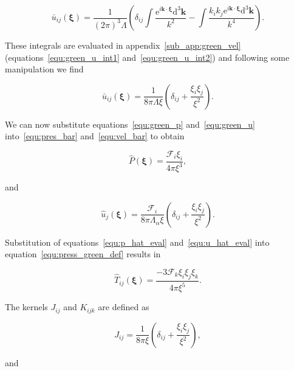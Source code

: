\documentclass[12pt]{article}
\begin{document}
\begin{equation}
\label{equ:green_u_int}
\bar{u}_{ij} (\boldsymbol\xi) = \frac{1}{(2 \pi)^{3} \Lambda} \left(\delta_{ij} \int \frac{\mathrm{e}^{i \boldsymbol{k} \cdot \boldsymbol\xi} \mathrm{d}^{3} \boldsymbol{k}}{k^{2}} - \int \frac{k_{i} k_{j} \mathrm{e}^{i \boldsymbol{k} \cdot \boldsymbol\xi} \mathrm{d}^{3} \boldsymbol{k}}{k^{4}} \right).
\end{equation}

These integrals are evaluated in appendix~\ref{sub_app:green_vel} (equations~\ref{equ:green_u_int1} and~\ref{equ:green_u_int2}) and following some manipulation we find

\begin{equation}
\label{equ:green_u}
\bar{u}_{ij} (\boldsymbol\xi) = \frac{1}{8 \pi \Lambda \xi} \left(\delta_{ij} + \frac{\xi_{i} \xi_{j}}{\xi^{2}} \right).
\end{equation}

We can now substitute equations~\ref{equ:green_p} and~\ref{equ:green_u} into~\ref{equ:pres_bar} and~\ref{equ:vel_bar} to obtain

\begin{equation}
\label{equ:p_hat_eval}
\hat{P} (\boldsymbol\xi) = \frac{\mathcal{F}_{i} \xi_{i}}{4 \pi \xi^{3}},
\end{equation}

and 

\begin{equation}
\label{equ:u_hat_eval}
\hat{u}_{j}(\boldsymbol\xi) = \frac{\mathcal{F}_{i}}{8 \pi \Lambda_{\alpha} \xi} \left(\delta_{ij} + \frac{\xi_{i} \xi_{j}}{\xi^{2}} \right).
\end{equation}


Substitution of equations~\ref{equ:p_hat_eval} and~\ref{equ:u_hat_eval} into equation~\ref{equ:press_green_def} results in

\begin{equation}
\label{equ:green_stress}
\hat{T}_{ij} (\boldsymbol\xi) = \frac{-3 \mathcal{F}_{k} \xi_{i} \xi_{j} \xi_{k}}{4 \pi \xi^{5}}.
\end{equation}


The kernels $J_{ij}$ and $K_{ijk}$ are defined as

\begin{equation}
\label{equ:j_kernel}
J_{ij} = \frac{1}{8 \pi \xi} \left(\delta_{ij} + \frac{\xi_{i} \xi_{j}}{\xi^{2}} \right),
\end{equation}

and 
\end{document}

